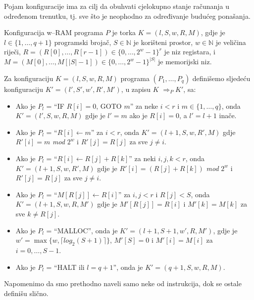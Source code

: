 Pojam konfiguracije ima za cilj da obuhvati cjelokupno stanje računanja u određenom trenutku, tj. sve što je neophodno za određivanje budućeg ponašanja.
\begin{definition}
Konfiguracija  {w}--RAM programa $P$ je torka $K = (l, S, w, R, M)$, gdje je $l \in  \{1, \ldots, q + 1\}$ 
programski brojač, $S \in  \mathbb{N}$ je korišteni prostor, $w \in  \mathbb{N}$ je veličina riječi, $R = (R[0], \ldots , R[r - 1]) \in  \{0, \ldots , 2^w - 1\}^r$ je
niz registara, i $M = (M[0], \ldots, M[|S| - 1]) \in  \{0, \ldots, 2^w - 1\}^{|S|}$ je memorijski niz.
\end{definition}
\begin{definition}
 Za konfiguraciju $K = (l, S, w, R, M)$   programa $(P_1, \ldots, P_q)$ definišemo sljedeću konfiguraciju $K' = (l', S', w', R', M')$, u zapisu $K$ $\Rightarrow_P K'$, sa:
 
 \begin{itemize}
 	\item Ako je $P_l$ = ``IF $R[i] = 0$, GOTO $m$'' za neke $i < r$ i $m \in  \{1, \ldots , q\}$, onda  $K' = (l', S, w, R, M)$ gdje je  $l'= m$ ako je $R[i] = 0$, a $l' = l + 1$ inače. 
 	\item Ako je $P_l$ = ``$R[i] \leftarrow  m$'' za $i < r$, onda $K' = (l  + 1, S, w, R', M)$ gdje  $R'[i] = m$ \emph{mod} $2^w$ i $R'[ j] = R[ j]$ za sve $j \neq i$. 
 	\item Ako je $P_l$ = ``$R[i] \leftarrow R[ j] + R[k]$'' za neki $i, j, k < r$, onda  $K' = (l+1, S, w, R', M)$   gdje je $R'[i] = (R[ j]+R[k])$ \textit{mod} $2^w$
 	i $R'[j] = R[j]$ za sve $j \neq i$.
 	\item Ako je $P_l$ = ``$M[R[ j]] \leftarrow R[i]$'' za $i, j < r$ i $R[ j] < S$, onda $K' = (l+ 1, S, w, R, M')$ gdje je $M'[R[ j]] = R[i]$ i
 	$M'[k] = M[k]$ za sve  $k \neq  R[ j]$.
 	\item Ako je $P_l$ = ``MALLOC'', onda je $K' = (l+ 1, S + 1, w', R, M')$, gdje je $w' = \max\{w, \lceil log_2(S + 1) \rceil \}$, $M'[S] = 0$ i
 	$M'[i] = M[i]$ za $i = 0, \ldots , S-1$.
 	\item Ako je $P_l$ = ``HALT ili  $l = q + 1$'', onda je $K' = (q + 1, S, w, R, M)$.
 \end{itemize}
 
 
\end{definition}

Napomenimo da smo prethodno naveli   samo neke od instrukcija, dok se ostale definišu slično. \\


